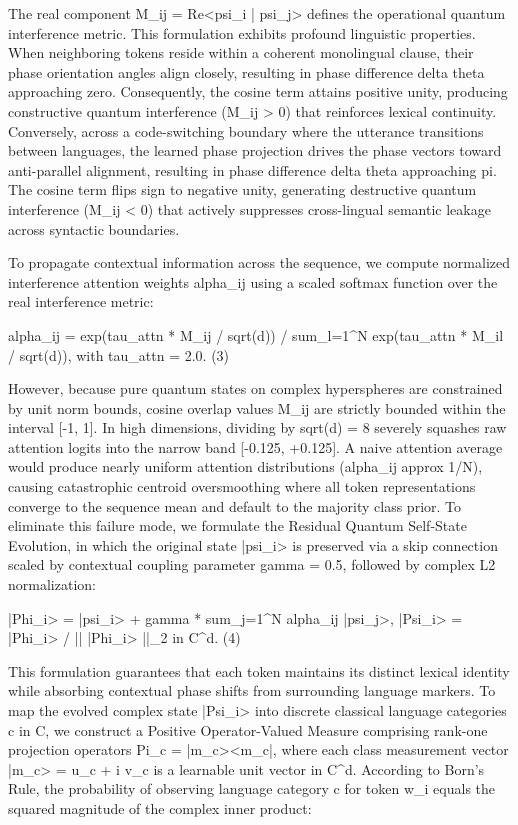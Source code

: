\documentclass[10pt,twocolumn,letterpaper]{article}
\theoremstyle{definition}
\begin{document}
The real component M\_{ij} = Re<psi\_i | psi\_j> defines the operational quantum interference metric. This formulation exhibits profound linguistic properties. When neighboring tokens reside within a coherent monolingual clause, their phase orientation angles align closely, resulting in phase difference delta theta approaching zero. Consequently, the cosine term attains positive unity, producing constructive quantum interference (M\_{ij} > 0) that reinforces lexical continuity. Conversely, across a code-switching boundary where the utterance transitions between languages, the learned phase projection drives the phase vectors toward anti-parallel alignment, resulting in phase difference delta theta approaching pi. The cosine term flips sign to negative unity, generating destructive quantum interference (M\_{ij} < 0) that actively suppresses cross-lingual semantic leakage across syntactic boundaries.

To propagate contextual information across the sequence, we compute normalized interference attention weights alpha\_{ij} using a scaled softmax function over the real interference metric:

alpha\_{ij} = exp(tau\_{attn} * M\_{ij} / sqrt(d)) / sum\_{l=1}^N exp(tau\_{attn} * M\_{il} / sqrt(d)),  with tau\_{attn} = 2.0.    (3)

However, because pure quantum states on complex hyperspheres are constrained by unit norm bounds, cosine overlap values M\_{ij} are strictly bounded within the interval [-1, 1]. In high dimensions, dividing by sqrt(d) = 8 severely squashes raw attention logits into the narrow band [-0.125, +0.125]. A naive attention average would produce nearly uniform attention distributions (alpha\_{ij} approx 1/N), causing catastrophic centroid oversmoothing where all token representations converge to the sequence mean and default to the majority class prior. To eliminate this failure mode, we formulate the Residual Quantum Self-State Evolution, in which the original state |psi\_i> is preserved via a skip connection scaled by contextual coupling parameter gamma = 0.5, followed by complex L2 normalization:

|Phi\_i> = |psi\_i> + gamma * sum\_{j=1}^N alpha\_{ij} |psi\_j>,    |Psi\_i> = |Phi\_i> / || |Phi\_i> ||\_2 in C^d.    (4)

This formulation guarantees that each token maintains its distinct lexical identity while absorbing contextual phase shifts from surrounding language markers. To map the evolved complex state |Psi\_i> into discrete classical language categories c in C, we construct a Positive Operator-Valued Measure comprising rank-one projection operators Pi\_c = |m\_c><m\_c|, where each class measurement vector |m\_c> = u\_c + i v\_c is a learnable unit vector in C^d. According to Born's Rule, the probability of observing language category c for token w\_i equals the squared magnitude of the complex inner product:
\end{document}
